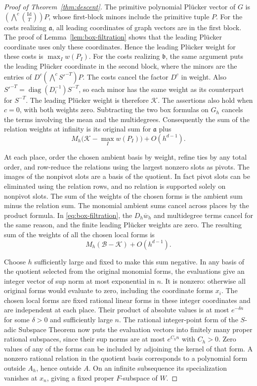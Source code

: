 \documentclass[11pt,a4paper,reqno]{amsart}
\theoremstyle{definition}
\theoremstyle{remark}
\numberwithin{equation}{section}
\begin{document}
\begin{proof}[Proof of Theorem~\ref{thm:descent}]
The primitive polynomial Pl\"ucker vector of \(G\) is
\((\bigwedge^c\binom{\mathrm{Id}}{T})P\), whose first-block minors
include the primitive tuple \(P\).
For the costs realizing \(\mathfrak a\), all leading coordinates
of graph vectors are in the first block. The proof of
Lemma~\ref{lem:box-filtration} shows that the leading Pl\"ucker
coordinate uses only these coordinates. Hence the leading
Pl\"ucker weight for these costs is \(\max_I w(P_I)\).
For the costs realizing \(\mathfrak b\), the same argument puts
the leading Pl\"ucker coordinate in the second block, where the
minors are the entries of \(D^c(\bigwedge^c S'^{-T})P\).
The costs cancel the factor \(D^c\) in weight. Also
\(S'^{-T}=\operatorname{diag}(D_i^{-1})S^{-T}\), so each minor
has the same weight as its counterpart for \(S^{-T}\).
The leading Pl\"ucker weight is therefore \(\mathcal K\).
The assertions also hold when \(c=0\), with both weights zero.
Subtracting the two box formulas on \(G_h\) cancels the terms
involving the mean and the multidegrees. Consequently the sum
of the relation weights at infinity is its original sum for
\(\mathfrak a\) plus
\[
 M_h\bigl(\mathcal K-\max_I w(P_I)\bigr)+O(h^{d-1}).
\]

At each place, order the chosen ambient basis by weight, refine
ties by any total order, and row-reduce the relations using the
largest nonzero slots as pivots. The images of the nonpivot
slots are a basis of the quotient. In fact pivot slots can be
eliminated using the relation rows, and no relation is supported
solely on nonpivot slots. The sum of the weights of the chosen
forms is the ambient sum minus the relation sum.
The monomial ambient sums cancel across places by the product
formula. In \eqref{eq:box-filtration}, the \(D_h\overline w_h\)
and multidegree terms cancel for the same reason, and the finite
leading Pl\"ucker weights are zero. The resulting sum of the
weights of all the chosen local forms is
\[
 M_h(\mathcal B-\mathcal K)+O(h^{d-1}).
\]

Choose \(h\) sufficiently large and fixed to make this sum
negative. In any basis of the quotient selected from the
original monomial forms, the evaluations give an integer
vector of sup norm at most exponential in \(n\).
It is nonzero: otherwise all original forms would evaluate to
zero, including the coordinate forms \(x_i\).
The chosen local forms are fixed rational linear forms in these
integer coordinates and are independent at each place.
Their product of absolute values is at most \(e^{-\delta n}\)
for some \(\delta>0\) and sufficiently large \(n\).
The rational integer-point form of the \(S\)-adic Subspace
Theorem \cite[Subspace Theorem]{CZ05} now puts the evaluation
vectors into finitely many proper rational subspaces, since
their sup norms are at most \(e^{C_h n}\) with \(C_h>0\).
Zero values of any of the forms can be included by adjoining
the kernel of that form. A nonzero rational relation in the
quotient basis corresponds to a polynomial form outside
\(A_h\), hence outside \(A\). On an infinite subsequence its
specialization vanishes at \(x_n\), giving a fixed proper
\(F\)-subspace of \(W\).
\end{proof}
\end{document}
